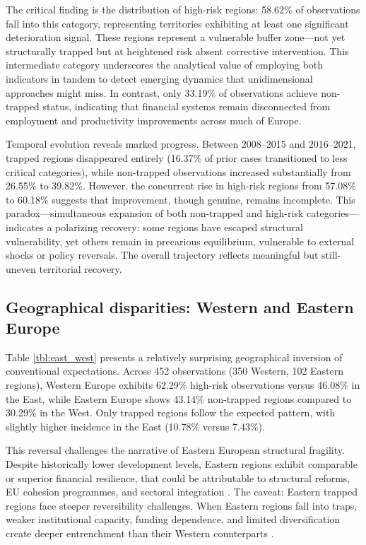 \documentclass[a4paper,11pt,oneside]{article}
\begin{document}
The critical finding is the distribution of high-risk regions: 58.62\% of observations fall into this category, representing territories exhibiting at least one significant deterioration signal. These regions represent a vulnerable buffer zone—not yet structurally trapped but at heightened risk absent corrective intervention. This intermediate category underscores the analytical value of employing both indicators in tandem to detect emerging dynamics that unidimensional approaches might miss. In contrast, only 33.19\% of observations achieve non-trapped status, indicating that financial systems remain disconnected from employment and productivity improvements across much of Europe.

Temporal evolution reveals marked progress. Between 2008--2015 and 2016--2021, trapped regions disappeared entirely (16.37\% of prior cases transitioned to less critical categories), while non-trapped observations increased substantially from 26.55\% to 39.82\%. However, the concurrent rise in high-risk regions from 57.08\% to 60.18\% suggests that improvement, though genuine, remains incomplete. This paradox---simultaneous expansion of both non-trapped and high-risk categories---indicates a polarizing recovery: some regions have escaped structural vulnerability, yet others remain in precarious equilibrium, vulnerable to external shocks or policy reversals. The overall trajectory reflects meaningful but still-uneven territorial recovery.



\subsection{Geographical disparities: Western and Eastern Europe}


Table \ref{tbl:east_west} presents a relatively surprising geographical inversion of conventional expectations. Across 452 observations (350 Western, 102 Eastern regions), Western Europe exhibits 62.29\% high-risk observations versus 46.08\% in the East, while Eastern Europe shows 43.14\% non-trapped regions compared to 30.29\% in the West. Only trapped regions follow the expected pattern, with slightly higher incidence in the East (10.78\% versus 7.43\%).


This reversal challenges the narrative of Eastern European structural fragility. Despite historically lower development levels, Eastern regions exhibit comparable or superior financial resilience, that could be attributable to structural reforms, EU cohesion programmes, and sectoral integration \citep{iammarino2019regional}. The caveat: Eastern trapped regions face steeper reversibility challenges. When Eastern regions fall into traps, weaker institutional capacity, funding dependence, and limited diversification create deeper entrenchment than their Western counterparts \citep{rodriguez2018revenge}.
\end{document}

